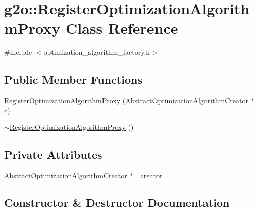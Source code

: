 \hypertarget{classg2o_1_1_register_optimization_algorithm_proxy}{}\section{g2o\+:\+:Register\+Optimization\+Algorithm\+Proxy Class Reference}
\label{classg2o_1_1_register_optimization_algorithm_proxy}


{\ttfamily \#include $<$optimization\+\_\+algorithm\+\_\+factory.\+h$>$}

\subsection*{Public Member Functions}
\begin{DoxyCompactItemize}
\item 
\mbox{\hyperlink{classg2o_1_1_register_optimization_algorithm_proxy_acf89c65d6156d53014e0dcafd388258c}{Register\+Optimization\+Algorithm\+Proxy}} (\mbox{\hyperlink{classg2o_1_1_abstract_optimization_algorithm_creator}{Abstract\+Optimization\+Algorithm\+Creator}} $\ast$c)
\item 
\mbox{\hyperlink{classg2o_1_1_register_optimization_algorithm_proxy_a30f84a170a0d140ee60e1bc428d4c65f}{$\sim$\+Register\+Optimization\+Algorithm\+Proxy}} ()
\end{DoxyCompactItemize}
\subsection*{Private Attributes}
\begin{DoxyCompactItemize}
\item 
\mbox{\hyperlink{classg2o_1_1_abstract_optimization_algorithm_creator}{Abstract\+Optimization\+Algorithm\+Creator}} $\ast$ \mbox{\hyperlink{classg2o_1_1_register_optimization_algorithm_proxy_a75e4119a0fdcfe4c4267cd86a90073d6}{\+\_\+creator}}
\end{DoxyCompactItemize}


\subsection{Constructor \& Destructor Documentation}
\mbox{\label{classg2o_1_1_register_optimization_algorithm_proxy_acf89c65d6156d53014e0dcafd388258c}} 

